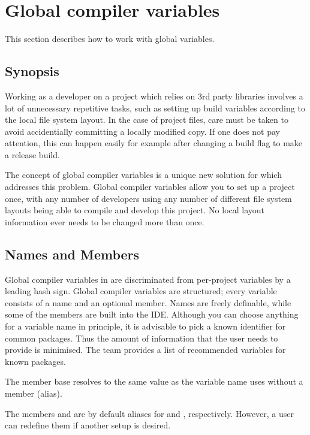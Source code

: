 \section{Global compiler variables}\label{sec:global_variables}

This section describes how to work with global variables.

\subsection{Synopsis}

Working as a developer on a project which relies on 3rd party libraries involves a lot of unnecessary repetitive tasks, such as setting up build variables according to the local file system layout. In the case of project files, care must be taken to avoid accidentially committing a locally modified copy. If one does not pay attention, this can happen easily for example after changing a build flag to make a release build.

The concept of global compiler variables is a unique new solution for \codeblocks which addresses this problem. Global compiler variables allow you to set up a project once, with any number of developers using any number of different file system layouts being able to compile and develop this project. No local layout information ever needs to be changed more than once.

\subsection{Names and Members}

Global compiler variables in \codeblocks are discriminated from per-project variables by a leading hash sign. Global compiler variables are structured; every variable consists of a name and an optional member. Names are freely definable, while some of the members are built into the IDE. Although you can choose anything for a variable name in principle, it is advisable to pick a known identifier for common packages. Thus the amount of information that the user needs to provide is minimised. The \codeblocks team provides a list of recommended variables for known packages.

The member base resolves to the same value as the variable name uses without a member (alias).

The members  and  are by default aliases for  and , respectively. However, a user can redefine them if another setup is desired.

